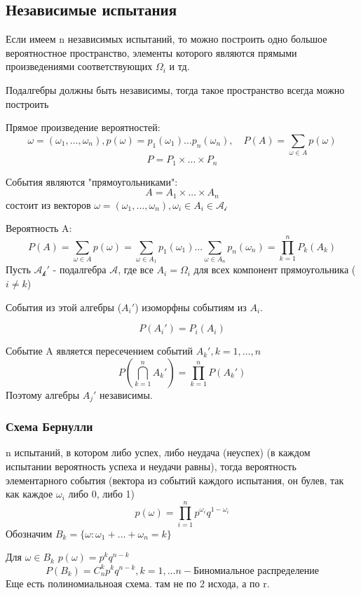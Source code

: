 \documentclass[a4paper]{article}
\theoremstyle{definition}
\theoremstyle{remark}
\begin{document}
\subsection{Независимые испытания}
Если имеем n независимых испытаний, то можно построить одно большое вероятностное пространство, элементы которого являются прямыми произведениями соответствующих $\Omega_i$ и тд.

Подалгебры должны быть независимы, тогда такое пространство всегда можно построить 

Прямое произведение вероятностей:
\[\omega = (\omega_1, \dots, \omega_n), p(\omega) = p_1(\omega_1)\dots p_n(\omega_n), \quad P(A) = \sum_{\omega\in A} p(\omega)\]
\[P = P_1 \times \dots \times P_n\]

События являются "прямоугольниками":
\[A = A_1 \times \dots \times A_n\]
состоит из векторов $\omega = (\omega_1, \dots, \omega_n), \omega_i\in A_i\in \mathscr{A_i}$ 

Вероятность A:
\[P(A) = \sum_{\omega\in A} p(\omega) = \sum_{\omega\in A_1} p_1(\omega_1)\dots \sum_{\omega\in A_n} p_n(\omega_n) = \prod_{k = 1}^{n}P_k(A_k)\]
Пусть $\mathscr{A_k'}$ - подалгебра $\mathscr{A}$, где все $A_i =\Omega_i$ для всех компонент прямоугольника ($i\neq k$)

События из этой алгебры ($A_i'$) изоморфны событиям из $A_i$.

\[P(A_i') = P_i(A_i)\]

Событие A является пересечением событий $A_k', k = 1, \dots, n$
\[P(\bigcap_{k = 1}^n A_k') = \prod_{k = 1}^{n}P(A_k')\]
Поэтому алгебры $A_j'$ независимы.
\subsubsection{Схема Бернулли}
n испытаний, в котором либо успех, либо неудача (неуспех) (в каждом испытании вероятность успеха и неудачи равны), тогда вероятность элементарного события (вектора из событий каждого испытания, он булев, так как каждое $\omega_i$ либо 0, либо 1) 
\[p(\omega) = \prod_{i = 1}^{n}p^{\omega_i}q^{1 - \omega_i}\]
Обозначим $B_k = \{\omega: \omega_1 + \dots + \omega_n = k\}$

Для $\omega \in B_k$ $p(\omega) = p^k q^{n-k}$
\[P(B_k) = C_n^k p^k q^{n-k}, k = 1, \dots n - \textbf{Биномиальное распределение}\]
Еще есть полиномиальноая схема. там не по 2 исхода, а по r.
\end{document}
